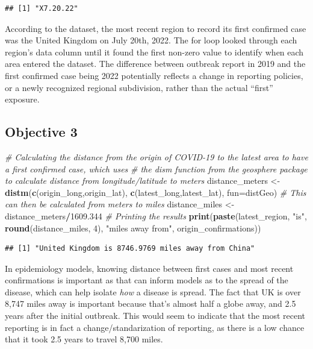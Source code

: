\documentclass[
]{article}
\newenvironment{Shaded}{\begin{snugshade}}{\end{snugshade}}
\newcommand{\AttributeTok}[1]{\textcolor[rgb]{0.13,0.29,0.53}{#1}}
\newcommand{\CommentTok}[1]{\textcolor[rgb]{0.56,0.35,0.01}{\textit{#1}}}
\newcommand{\DecValTok}[1]{\textcolor[rgb]{0.00,0.00,0.81}{#1}}
\newcommand{\FloatTok}[1]{\textcolor[rgb]{0.00,0.00,0.81}{#1}}
\newcommand{\FunctionTok}[1]{\textcolor[rgb]{0.13,0.29,0.53}{\textbf{#1}}}
\newcommand{\NormalTok}[1]{#1}
\newcommand{\OtherTok}[1]{\textcolor[rgb]{0.56,0.35,0.01}{#1}}
\newcommand{\SpecialCharTok}[1]{\textcolor[rgb]{0.81,0.36,0.00}{\textbf{#1}}}
\newcommand{\StringTok}[1]{\textcolor[rgb]{0.31,0.60,0.02}{#1}}
\begin{document}
\begin{verbatim}
## [1] "X7.20.22"
\end{verbatim}

According to the dataset, the most recent region to record its first
confirmed case was the United Kingdom on July 20th, 2022. The for loop
looked through each region's data column until it found the first
non-zero value to identify when each area entered the dataset. The
difference between outbreak report in 2019 and the first confirmed case
being 2022 potentially reflects a change in reporting policies, or a
newly recognized regional subdivision, rather than the actual ``first''
exposure.

\subsection{Objective 3}\label{objective-3}

\begin{Shaded}
\begin{Highlighting}[]
\CommentTok{\# Calculating the distance from the origin of COVID{-}19 to the latest area to have a first confirmed case, which uses}
\CommentTok{\# the dism function from the geosphere package to calculate distance from longitude/latitude to meters}
\NormalTok{distance\_meters }\OtherTok{\textless{}{-}} \FunctionTok{distm}\NormalTok{(}\FunctionTok{c}\NormalTok{(origin\_long,origin\_lat), }\FunctionTok{c}\NormalTok{(latest\_long,latest\_lat), }\AttributeTok{fun=}\NormalTok{distGeo)}
\CommentTok{\# This can then be calculated from meters to miles}
\NormalTok{distance\_miles }\OtherTok{\textless{}{-}}\NormalTok{ distance\_meters}\SpecialCharTok{/}\FloatTok{1609.344}
\CommentTok{\# Printing the results}
\FunctionTok{print}\NormalTok{(}\FunctionTok{paste}\NormalTok{(latest\_region, }\StringTok{"is"}\NormalTok{, }\FunctionTok{round}\NormalTok{(distance\_miles, }\DecValTok{4}\NormalTok{), }\StringTok{"miles away from"}\NormalTok{, origin\_confirmations))}
\end{Highlighting}
\end{Shaded}

\begin{verbatim}
## [1] "United Kingdom is 8746.9769 miles away from China"
\end{verbatim}

In epidemiology models, knowing distance between first cases and most
recent confirmations is important as that can inform models as to the
spread of the disease, which can help isolate \emph{how} a disease is
spread. The fact that UK is over 8,747 miles away is important because
that's almost half a globe away, and 2.5 years after the initial
outbreak. This would seem to indicate that the most recent reporting is
in fact a change/standarization of reporting, as there is a low chance
that it took 2.5 years to travel 8,700 miles.
\end{document}
